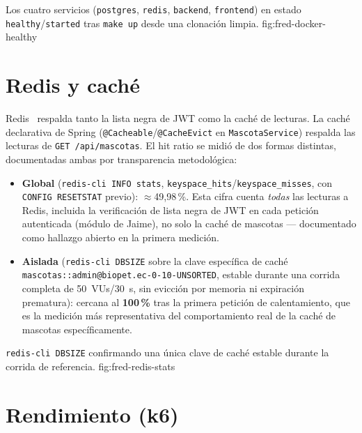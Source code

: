 %
{Los cuatro servicios (\texttt{postgres}, \texttt{redis}, \texttt{backend}, \texttt{frontend}) en estado \texttt{healthy}/\texttt{started} tras \texttt{make up} desde una clonaci\'on limpia.}%
{fig:fred-docker-healthy}

\section{Redis y cach\'e}

Redis~\cite{redis-docs} respalda tanto la lista negra de JWT como la
cach\'e de lecturas. La cach\'e declarativa de Spring
(\texttt{@Cacheable}/\texttt{@CacheEvict} en \texttt{MascotaService})
respalda las lecturas de \texttt{GET /api/mascotas}. El hit ratio se midi\'o
de dos formas distintas, documentadas ambas por transparencia
metodol\'ogica:

\begin{itemize}[nosep]
  \item \textbf{Global} (\texttt{redis-cli INFO stats},
    \texttt{keyspace_hits}/\texttt{keyspace_misses}, con
    \texttt{CONFIG RESETSTAT} previo): $\approx$49{,}98\,\%. Esta cifra
    cuenta \emph{todas} las lecturas a Redis, incluida la verificaci\'on de
    lista negra de JWT en cada petici\'on autenticada (m\'odulo de Jaime),
    no solo la cach\'e de mascotas --- documentado como hallazgo abierto en
    la primera medici\'on.
  \item \textbf{Aislada} (\texttt{redis-cli DBSIZE} sobre la clave espec\'ifica
    de cach\'e \texttt{mascotas::admin@biopet.ec-0-10-UNSORTED}, estable
    durante una corrida completa de 50~VUs/30~s, sin evicci\'on por memoria
    ni expiraci\'on prematura): cercana al \textbf{100\,\%} tras la primera
    petici\'on de calentamiento, que es la medici\'on m\'as representativa
    del comportamiento real de la cach\'e de mascotas espec\'ificamente.
\end{itemize}

%
{\texttt{redis-cli DBSIZE} confirmando una \'unica clave de cach\'e estable durante la corrida de referencia.}%
{fig:fred-redis-stats}

\section{Rendimiento (k6)}
\label{sec:rendimiento-k6}


